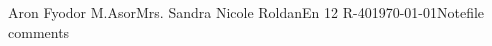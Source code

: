 \documentclass[12pt,letterpaper]{article}
\begin{document}
\begin{mla}{Aron Fyodor M.}{Asor}{Mrs. Sandra Nicole Roldan}{En 12 R-40}{\today}{Notefile comments}

\end{mla}
\end{document}
